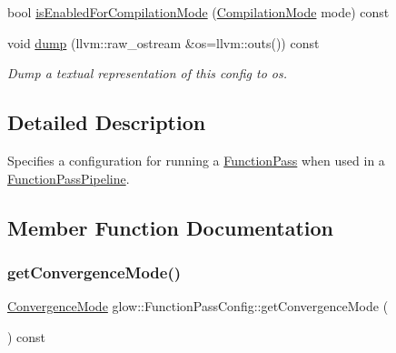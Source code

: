 \begin{DoxyCompactItemize}
\item 
bool \hyperlink{classglow_1_1_function_pass_config_a9caada9d436194e152e8d33404a1aa08}{is\+Enabled\+For\+Compilation\+Mode} (\hyperlink{structglow_1_1_compilation_context_a92efb87746c0edf7756b84fdcd87014a}{Compilation\+Mode} mode) const
\item 
\mbox{\label{classglow_1_1_function_pass_config_ae2320b7777ea122b3abaec25c8ed2bc5}} 
void \hyperlink{classglow_1_1_function_pass_config_ae2320b7777ea122b3abaec25c8ed2bc5}{dump} (llvm\+::raw\+\_\+ostream \&os=llvm\+::outs()) const
\begin{DoxyCompactList}\small\item\em Dump a textual representation of this config to {\ttfamily os}. \end{DoxyCompactList}\end{DoxyCompactItemize}


\subsection{Detailed Description}
Specifies a configuration for running a \hyperlink{classglow_1_1_function_pass}{Function\+Pass} when used in a \hyperlink{classglow_1_1_function_pass_pipeline}{Function\+Pass\+Pipeline}. 

\subsection{Member Function Documentation}
\mbox{\label{classglow_1_1_function_pass_config_a3dbd1251a57ecf108bd6157a34743e6d}} 
\subsubsection{\texorpdfstring{get\+Convergence\+Mode()}{getConvergenceMode()}}
{\footnotesize\ttfamily \hyperlink{namespaceglow_a56845b9c860fa69d01d2084361d7c1f0}{Convergence\+Mode} glow\+::\+Function\+Pass\+Config\+::get\+Convergence\+Mode (\begin{DoxyParamCaption}{ }\end{DoxyParamCaption}) const\hspace{0.3cm}{\ttfamily [inline]}}

